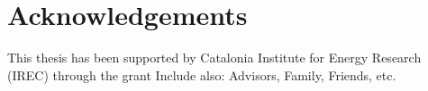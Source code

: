 \chapter*{Acknowledgements}

This thesis has been supported by Catalonia Institute for Energy Research (IREC) through the grant 
Include also: Advisors, Family, Friends, etc.
